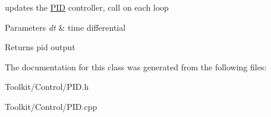 updates the \hyperlink{class_rhesus_1_1_toolkit_1_1_control_1_1_p_i_d}{P\-I\-D} controller, call on each loop 


\begin{DoxyParams}{Parameters}
{\em dt} & time differential \\
\hline
\end{DoxyParams}
\begin{DoxyReturn}{Returns}
pid output 
\end{DoxyReturn}


The documentation for this class was generated from the following files\-:\begin{DoxyCompactItemize}
\item 
Toolkit/\-Control/P\-I\-D.\-h\item 
Toolkit/\-Control/P\-I\-D.\-cpp\end{DoxyCompactItemize}
